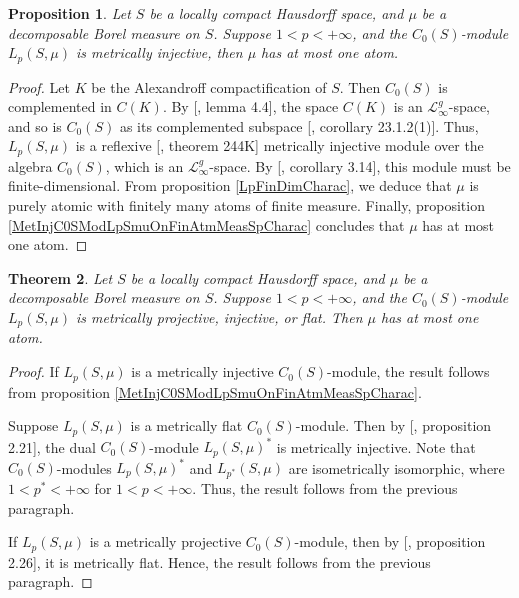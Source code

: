 \documentclass[12pt]{article}
\newtheorem{theorem}{Theorem}[section]
\newtheorem{proposition}[theorem]{Proposition}
\begin{document}
\begin{proposition}\label{MetInjC0SModLpSmuCharac}
    Let $S$ be a locally compact Hausdorff space, and $\mu$ be a decomposable 
    Borel measure on $S$. Suppose $1 < p < +\infty$, and 
    the $C_0(S)$-module $L_p(S,\mu)$ is metrically injective, 
    then $\mu$ has at most one atom.
\end{proposition}
\begin{proof} 
    Let $K$ be the Alexandroff compactification of $S$. 
    Then $C_0(S)$ is complemented in $C(K)$. 
    By [\cite{DefFloTensNorOpId}, lemma 4.4], the space $C(K)$ is 
    an $\mathscr{L}_\infty^g$-space, and so is $C_0(S)$ as its complemented 
    subspace [\cite{DefFloTensNorOpId}, corollary 23.1.2(1)]. 
    Thus, $L_p(S,\mu)$ is a reflexive [\cite{FremMeasTh2}, theorem 244K] 
    metrically injective module over the algebra $C_0(S)$, which is 
    an $\mathscr{L}_\infty^g$-space. 
    By [\cite{NemGeomProjInjFlatBanMod}, corollary 3.14], this module must be 
    finite-dimensional. From proposition \ref{LpFinDimCharac}, we 
    deduce that $\mu$ is purely atomic with finitely many atoms of finite 
    measure. Finally, proposition \ref{MetInjC0SModLpSmuOnFinAtmMeasSpCharac} 
    concludes that $\mu$ has at most one atom.
\end{proof}

\begin{theorem}\label{MetInjPlotjFlatC0SModLpSmuCharac}
    Let $S$ be a locally compact Hausdorff space, and $\mu$ be a decomposable 
    Borel measure on $S$. Suppose $1 < p < +\infty$, and 
    the $C_0(S)$-module $L_p(S,\mu)$ is metrically projective, injective, or 
    flat. Then $\mu$ has at most one atom.
\end{theorem}
\begin{proof} 
    If $L_p(S,\mu)$ is a metrically injective $C_0(S)$-module, the result 
    follows from proposition \ref{MetInjC0SModLpSmuOnFinAtmMeasSpCharac}. 
    
    Suppose $L_p(S,\mu)$ is a metrically flat $C_0(S)$-module. Then 
    by [\cite{NemGeomProjInjFlatBanMod}, proposition 2.21], the 
    dual $C_0(S)$-module $L_p(S,\mu)^*$ is metrically injective. Note 
    that $C_0(S)$-modules $L_p(S,\mu)^*$ and $L_{p^*}(S,\mu)$ are 
    isometrically isomorphic, where $1 < p^* < +\infty$ for $1 < p < +\infty$. 
    Thus, the result follows from the previous paragraph.
    
    If $L_p(S,\mu)$ is a metrically projective $C_0(S)$-module, then 
    by [\cite{NemGeomProjInjFlatBanMod}, proposition 2.26], it is metrically 
    flat. Hence, the result follows from the previous paragraph.
\end{proof}
\end{document}
